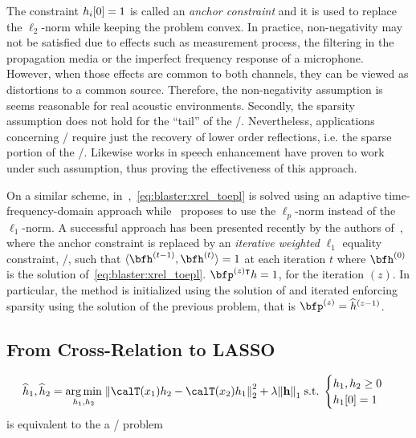 The constraint $h_i[0]=1$ is called an \textit{anchor constraint} and it is used to replace the $\ell_2$-norm while keeping the problem convex.
In practice, non-negativity may not be satisfied due to effects such as measurement process, the filtering in the propagation media or the imperfect frequency response of a microphone.
However, when those effects are common to both channels, they can be viewed as distortions to a common source.
Therefore, the non-negativity assumption is seems reasonable for real acoustic environments.
Secondly, the sparsity assumption does not hold for the ``tail'' of the \RIR/.
Nevertheless, applications concerning \RooGE/ require just the recovery of lower order reflections, i.e. the sparse portion of the \RIR/.
Likewise works in speech enhancement have proven to work under such assumption, thus proving the effectiveness of this approach.

On a similar scheme, in~,~\cref{eq:blaster:xrel_toepl} is solved using an adaptive time-frequency-domain approach while~ proposes to use the $\ell_p$-norm instead of the $\ell_1$-norm.
A successful approach has been presented recently by the authors of~, where the anchor constraint is replaced by an \textit{iterative weighted} $\ell_1$ equality constraint, \ie/, such that $\langle{\bfh^{(t-1)},\bfh^{(t)}}\rangle=1$ at each iteration $t$ where $\bfh^{(0)}$ is the solution of~\cref{eq:blaster:xrel_toepl}.
$\bfp^{(z)\intercal}\disFilter = 1$, for the iteration $(z)$.
In particular, the method is initialized using the solution of  and iterated enforcing sparsity using the solution of the previous problem, that is $\bfp^{(z)} = \disFilterHat^{(z-1)}$.

\subsection{From Cross-Relation to LASSO}
\begin{equation}
    \disFilterHat_1, \disFilterHat_2
    =
    \kargmin_{\disFilter_1, \disFilter_2}
    \;
    \kvvbar{
        \calT(\disRecordedSignal_1) \disFilter_2
        -
        \calT(\disRecordedSignal_2) \disFilter_1
    }_2^2
    +
    \lambda
    \kvvbar{
        \mathbf{\disFilter}
    }_1
    \; \text{s.t.} \;
    \begin{cases}
        \disFilter_1, \disFilter_2 \geq 0 \\
        \disFilter_1[0] = 1\\
    \end{cases}
\end{equation}
is equivalent to the a \LASSO/ problem


